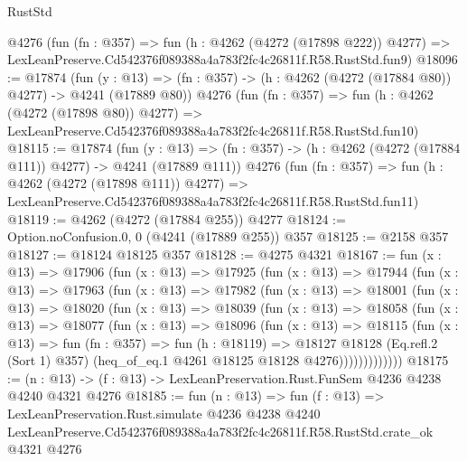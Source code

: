 \begin{lexlean}{RustStd}
\begin{coremodule}
    @4276
    (fun (fn : @357) =>
    fun (h : @4262 (@4272 (@17898 @222)) @4277) =>
    LexLeanPreserve.Cd542376f089388a4a783f2fc4c26811f.R58.RustStd.fun9)
@18096 := @17874
    (fun (y : @13) => (fn : @357) -> (h : @4262 (@4272 (@17884 @80)) @4277) -> @4241 (@17889 @80))
    @4276
    (fun (fn : @357) =>
    fun (h : @4262 (@4272 (@17898 @80)) @4277) =>
    LexLeanPreserve.Cd542376f089388a4a783f2fc4c26811f.R58.RustStd.fun10)
@18115 := @17874
    (fun (y : @13) => (fn : @357) -> (h : @4262 (@4272 (@17884 @111)) @4277) -> @4241 (@17889 @111))
    @4276
    (fun (fn : @357) =>
    fun (h : @4262 (@4272 (@17898 @111)) @4277) =>
    LexLeanPreserve.Cd542376f089388a4a783f2fc4c26811f.R58.RustStd.fun11)
@18119 := @4262 (@4272 (@17884 @255)) @4277
@18124 := Option.noConfusion.{0, 0} (@4241 (@17889 @255)) @357
@18125 := @2158 @357
@18127 := @18124 @18125 @357
@18128 := @4275 @4321
@18167 := fun (x : @13) =>
  @17906
    (fun (x : @13) =>
    @17925
      (fun (x : @13) =>
      @17944
        (fun (x : @13) =>
        @17963
          (fun (x : @13) =>
          @17982
            (fun (x : @13) =>
            @18001
              (fun (x : @13) =>
              @18020
                (fun (x : @13) =>
                @18039
                  (fun (x : @13) =>
                  @18058
                    (fun (x : @13) =>
                    @18077
                      (fun (x : @13) =>
                      @18096
                        (fun (x : @13) =>
                        @18115
                          (fun (x : @13) =>
                          fun (fn : @357) =>
                          fun (h : @18119) =>
                          @18127
                            @18128
                            (Eq.refl.{2} (Sort 1) @357)
                            (heq_of_eq.{1} @4261 @18125 @18128 @4276)))))))))))))
@18175 := (n : @13) -> (f : @13) -> LexLeanPreservation.Rust.FunSem @4236 @4238 @4240 @4321 @4276
@18185 := fun (n : @13) =>
  fun (f : @13) =>
  LexLeanPreservation.Rust.simulate
    @4236
    @4238
    @4240
    LexLeanPreserve.Cd542376f089388a4a783f2fc4c26811f.R58.RustStd.crate_ok
    @4321
    @4276
\end{coremodule}
\end{lexlean}
